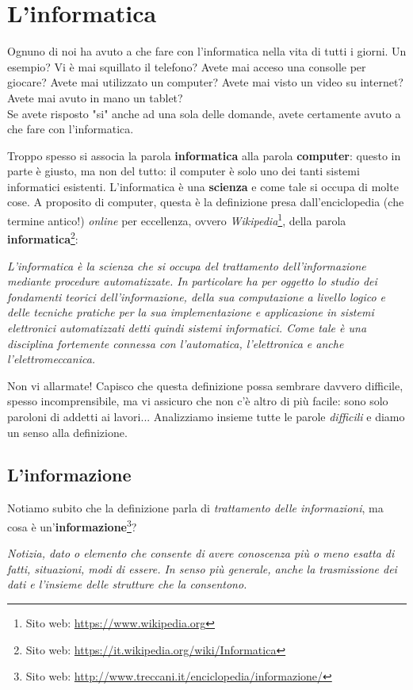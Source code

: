 \documentclass[11pt,fleqn,a5paper]{book} %
\begin{document}
        \section{L'informatica}
        \label{sec: L'informatica oggi}
    		Ognuno di noi ha avuto a che fare con l'informatica nella vita di tutti i giorni. Un esempio? Vi è mai squillato il telefono? Avete mai acceso una consolle per giocare? Avete mai utilizzato un computer? Avete mai visto un video su internet? Avete mai avuto in mano un tablet?\\ Se avete risposto "si" anche ad una sola delle domande, avete certamente avuto a che fare con l'informatica.
    		
    		Troppo spesso si associa la parola \textbf{informatica} alla parola \textbf{computer}: questo in parte è giusto, ma non del tutto: il computer è solo uno dei tanti sistemi informatici esistenti. L'informatica è una \textbf{scienza} e come tale si occupa di molte cose.
    		A proposito di computer, questa è la definizione presa dall'enciclopedia (che termine antico!) \textit{online} per eccellenza, ovvero \textit{Wikipedia}\footnote{Sito web: \url{https://www.wikipedia.org}}, della parola \textbf{informatica}\footnote{Sito web: \url{https://it.wikipedia.org/wiki/Informatica}}:    		
    		\begin{definition}[Informatica]\label{def: Informatica}
    			\textit{L'informatica è la scienza che si occupa del trattamento dell'informazione mediante procedure automatizzate. In particolare ha per oggetto lo studio dei fondamenti teorici dell'informazione, della sua computazione a livello logico e delle tecniche pratiche per la sua implementazione e applicazione in sistemi elettronici automatizzati detti quindi sistemi informatici. Come tale è una disciplina fortemente connessa con l'automatica, l'elettronica e anche l'elettromeccanica.}
    		\end{definition}
    	
    		Non vi allarmate! Capisco che questa definizione possa sembrare davvero difficile, spesso incomprensibile, ma vi assicuro che non c'è altro di più facile: sono solo paroloni di addetti ai lavori... Analizziamo insieme tutte le parole \textit{difficili} e diamo un senso alla definizione.
    	
    		\subsection{L'informazione}
    		\label{sub: L'informazione}
    			Notiamo subito che la definizione parla di \textit{trattamento delle informazioni}, ma cosa è un'\textbf{informazione}\footnote{Sito web: \url{http://www.treccani.it/enciclopedia/informazione/}}?
    			\begin{definition}[Informazione]\label{def: Informazione}
    				\textit{Notizia, dato o elemento che consente di avere conoscenza più o meno esatta di fatti, situazioni, modi di essere. In senso più generale, anche la trasmissione dei dati e l’insieme delle strutture che la consentono.}
    			\end{definition}
    		
\end{document}
